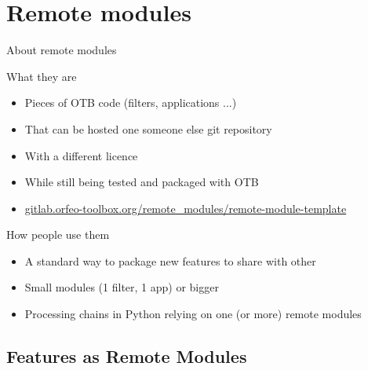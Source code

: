 \section{Remote modules}

\begin{frame}{About remote modules}
\begin{block}{What they are}
  \begin{itemize}
    \item Pieces of OTB code (filters, applications ...)
    \item That can be hosted one someone else git repository
    \item With a different licence
    \item While still being tested and packaged with OTB
    \item \url{gitlab.orfeo-toolbox.org/remote_modules/remote-module-template}
  \end{itemize}
\end{block}

\begin{block}{How people use them}
  \begin{itemize}
    \item A standard way to package new features to share with other
    \item Small modules (1 filter, 1 app) or bigger
    \item Processing chains in Python relying on one (or more) remote modules
    \end{itemize}
\end{block}  
\end{frame}

\subsection{Features as Remote Modules}

